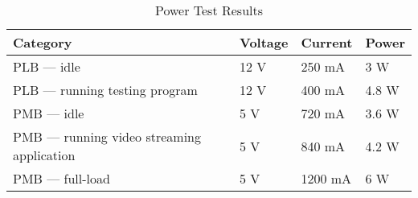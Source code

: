 \begin{table}[H]
    \caption{Power Test Results}
	\centering
	\begin{tabular}{llll}
	\hline
	\textbf{Category} & \textbf{Voltage} & \textbf{Current} & \textbf{Power} \\
	\hline
    PLB --- idle & 12 V & 250 mA & 3 W\\
    PLB --- running testing program & 12 V & 400 mA & 4.8 W\\
    PMB --- idle & 5 V & 720 mA & 3.6 W\\
    PMB --- running video streaming application & 5 V & 840 mA & 4.2 W\\
    PMB --- full-load & 5 V & 1200 mA & 6 W\\
	\hline
	\end{tabular}
\end{table}